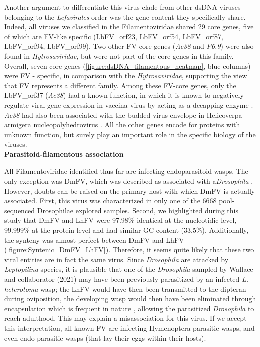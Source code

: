 Another argument to differentiate this virus clade from other dsDNA viruses belonging to the \textit{Lefavirales} order was the gene content they specifically share. Indeed, all viruses we classified in the Filamentoviridae shared 29 core genes, five of which are FV-like specific (LbFV\_orf23, LbFV\_orf54, LbFV\_orf87, LbFV\_orf94, LbFV\_orf99). Two other FV-core genes (\textit{Ac38} and \textit{P6.9}) were also found in \textit{Hytrosaviridae}, but were not part of the core-genes in this family. Overall, seven core genes (\figurename{\ref{figure:dsDNA_filamentous_heatmap}}, blue columns) were FV - specific, in comparison with the \textit{Hytrosaviridae}, supporting the view that FV represents a different family.   Among these FV-core genes, only the LbFV\_orf37 (\textit{Ac38}) had a known function, in which it is known to negatively regulate viral gene expression in vaccina virus by acting as a decapping enzyme \citep{parrish_characterization_2007}. \textit{Ac38} had also been associated with the budded virus envelope in Helicoverpa armigera nucleopolyhedrovirus \citep{wang_characterization_2005}. All the other genes encode for proteins with unknown function, but surely play an important role in the specific biology of the viruses. \\


\textbf{Parasitoid-filamentous association} 

All Filamentoviridae identified thus far are infecting endoparasitoid wasps. The only exception was DmFV, which was described as associated with a\textit{Drosophila} \citep{wallace_discovery_2021}. However, doubts can be raised on the primary host with which DmFV is actually associated. First, this virus was characterized in only one of the 6668 pool-sequenced Drosophilae explored samples. Second, we highlighted during this study that DmFV and LhFV were 97.98\% identical at the nucleotidic level, 99.999\% at the protein level and had similar GC content (33.5\%).  Additionally, the synteny was almost perfect between DmFV and LhFV (\figurename{\ref{figure:Syntenic_DmFV_LhFV}}). Therefore, it seems quite likely that these two viral entities are in fact the same virus. Since \textit{Drosophila} are attacked by \textit{Leptopilina} species, it is plausible that one of the \textit{Drosophila} sampled by Wallace and collaborator (2021) may have been previously parasitized by an infected \textit{L. heterotoma} wasp; the LhFV would have then been transmitted to the dipteran during oviposition, the developing wasp would then have been eliminated through encapsulation which is frequent in nature \citep{carton_encapsulation_1985}, allowing the parasitized \textit{Drosophila} to reach adulthood. This may explain a misassociation for this virus. If we accept this interpretation, all known FV are infecting Hymenoptera parasitic wasps, and even endo-parasitic wasps (that lay their eggs within their hosts). 

